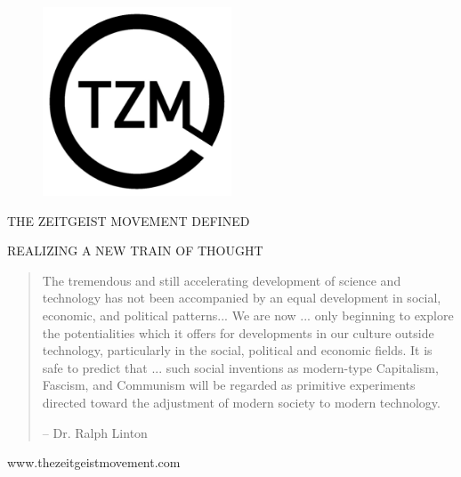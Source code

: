 \documentclass[10pt, a4paper, cleardoubleempty, openright, twoside]{book}
\begin{document}
\frontmatter
\pagestyle{empty}


	\begin{figure}[h!]
		\begin{center}
			\includegraphics[width=0.5\textwidth]{figures/logo}
		\end{center}
	\end{figure}

	\vfill 

\begin{center}
	\begin{Huge}
		THE ZEITGEIST MOVEMENT DEFINED
	\end{Huge}

	\vfill

	\begin{LARGE}
		REALIZING A NEW TRAIN OF THOUGHT
	\end{LARGE}

	\vfill 

	\begin{quote}
	\begin{itshape}
		The tremendous and still accelerating development of science and
		technology has not been accompanied by an equal development in
		social, economic, and political patterns... We are now ... only
		beginning to explore the potentialities which it offers for
		developments in our culture outside technology, particularly in the
		social, political and economic fields. It is safe to predict that
		... such social inventions as modern-type Capitalism, Fascism, and
		Communism will be regarded as primitive experiments directed toward
		the adjustment of modern society to modern technology.\\
	\end{itshape}
		-- Dr. Ralph Linton
	\end{quote}

	\vfill 

	www.thezeitgeistmovement.com

\end{center}
\end{document}
